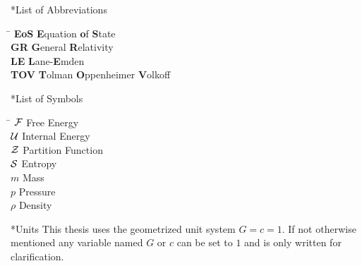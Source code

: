 \thispagestyle{empty}
\begin{section}*{List of Abbreviations}
\begin{tabbing}
\hspace{2cm}\= \kill
\textbf{EoS}        \> \textbf{E}quation \textbf{o}f \textbf{S}tate\\
\textbf{GR} 		\> \textbf{G}eneral \textbf{R}elativity \\
\textbf{LE}			\> \textbf{L}ane-\textbf{E}mden\\
\textbf{TOV}		\> \textbf {T}olman \textbf{O}ppenheimer \textbf{V}olkoff


\end{tabbing}


\end{section}
\begin{section}*{List of Symbols}
\begin{tabbing}
\hspace{2cm}\=\kill
$\mathcal{F}$				\> Free Energy\\
$\mathcal{U}$				\> Internal Energy\\
$\mathcal{Z}$				\> Partition Function\\
$\mathcal{S}$				\> Entropy\\
$m$					\> Mass\\
$p$					\> Pressure\\
$\rho$				\> Density
\end{tabbing}

\end{section}

\begin{section}*{Units}
This thesis uses the geometrized unit system $G=c=1$.
If not otherwise mentioned any variable named $G$ or $c$ can be set to $1$ and is only written for clarification.
\end{section}
